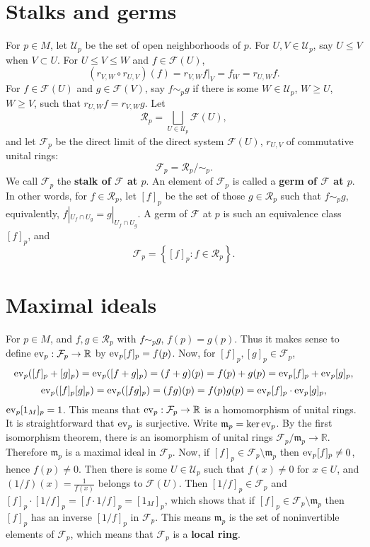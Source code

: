 \documentclass{article}
\newcommand{\ev}{\ensuremath\mathrm{ev}}
\theoremstyle{definition}
\begin{document}
\section{Stalks and germs}
For $p \in M$, let $\mathcal{U}_p$ be the set of open neighborhoods of $p$. For $U,V \in \mathcal{U}_p$, say $U \leq V$
when $V \subset U$. For $U \leq V \leq W$ and $f \in \mathcal{F}(U)$,
\[
(r_{V,W} \circ r_{U,V}) (f) = r_{V,W} f|_V = f_W = r_{U,W} f.
\]
For $f \in \mathcal{F}(U)$ and $g \in \mathcal{F}(V)$, say $f \sim_p g$ if
there is some $W \in \mathcal{U}_p$, $W \geq U$, $W \geq V$, such that  
$r_{U,W} f = r_{V,W} g$. 
Let 
\[
\mathcal{R}_p =   \bigsqcup_{U \in \mathcal{U}_p} \mathcal{F}(U),
\]
and
let $\mathcal{F}_p$ be the direct limit of the direct system $\mathcal{F}(U)$, $r_{U,V}$ of commutative unital rings: 
\[
\mathcal{F}_p = \mathcal{R}_p / \sim_p.
\]
We call $\mathcal{F}_p$ the \textbf{stalk of $\mathcal{F}$ at $p$}.
An element of $\mathcal{F}_p$ is called a \textbf{germ of $\mathcal{F}$ at $p$}.
In other words, 
for $f \in \mathcal{R}_p$, let
$[f]_p$ be the set of those $g \in \mathcal{R}_p$ such that 
$f \sim_p g$, equivalently, 
$f|_{U_f \cap U_g} = g|_{U_f \cap U_g}$. A germ of $\mathcal{F}$ at $p$ is such an equivalence class $[f]_p$, and
\[
\mathcal{F}_p = \left\{ [f]_p: f \in \mathcal{R}_p \right\}.
\]


\section{Maximal ideals}
For $p \in M$, and $f,g \in \mathcal{R}_p$ with $f \sim_p g$, $f(p)=g(p)$. Thus it makes sense to define
$\ev_p:\mathcal{F}_p \to \mathbb{R}$ by $\ev_p [f]_p = f(p)$. Now, for $[f]_p,[g]_p \in \mathcal{F}_p$, 
\[
\ev_p ([f]_p + [g]_p) = \ev_p([f+g]_p) = (f+g)(p) = f(p)+g(p) = \ev_p [f]_p + \ev_p [g]_p,
\]
\[
\ev_p ([f]_p [g]_p) = \ev_p ([fg]_p) = (fg)(p) = f(p)g(p) = \ev_p [f]_p \cdot \ev_p [g]_p,
\]
$\ev_p [1_M]_p = 1$. This means that $\ev_p:\mathcal{F}_p \to \mathbb{R}$ is a homomorphism of unital rings. It is straightforward
that $\ev_p$ is surjective. Write
$\mathfrak{m}_p = \ker \ev_p$. By the first isomorphism theorem, there is an isomorphism of unital rings
$\mathcal{F}_p / \mathfrak{m}_p \to \mathbb{R}$. Therefore
$\mathfrak{m}_p$ is a maximal ideal in $\mathcal{F}_p$. 
Now, if $[f]_p \in \mathcal{F}_p \setminus \mathfrak{m}_p$ then 
$\ev_p [f]_p \neq 0$, hence $f(p) \neq 0$. Then there is some $U \in \mathcal{U}_p$ such that
$f(x) \neq 0$ for $x \in U$, and $(1/f)(x) = \frac{1}{f(x)}$ belongs to $\mathcal{F}(U)$. Then
$[1/f]_p \in \mathcal{F}_p$ and $[f]_p \cdot [1/f]_p = [f \cdot 1/f]_p = [1_M]_p$, which shows that if
$[f]_p \in \mathcal{F}_p \setminus \mathfrak{m}_p$ then $[f]_p$ has an inverse $[1/f]_p$ in $\mathcal{F}_p$. 
This means $\mathfrak{m}_p$ is the set of noninvertible elements of $\mathcal{F}_p$, which means that
$\mathcal{F}_p$ is a \textbf{local ring}. 
\end{document}
